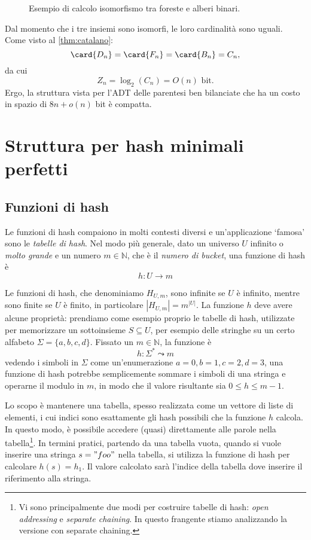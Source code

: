 \begin{figure}[ht]
	\centering
	
	\caption{Esempio di calcolo isomorfismo tra foreste e alberi binari.}
	\label{fig:iso_forest_bintree_example}
\end{figure}

Dal momento che i tre insiemi sono isomorfi, le loro cardinalità sono uguali. Come visto al \cref{thm:catalano}:
\begin{equation*}
	\card{D_n}=\card{F_n}=\card{B_n}=C_n \text,
\end{equation*}
da cui
\begin{equation*}
	Z_n=\log_2(C_n)=O(n) \text{ bit}.
\end{equation*}
Ergo, la struttura vista per l'ADT delle parentesi ben bilanciate che ha un costo in spazio di $8n+o(n)$ bit è compatta.



\section{Struttura per hash minimali perfetti}
\subsection{Funzioni di hash}
Le funzioni di hash compaiono in molti contesti diversi e un'applicazione
`famosa' sono le \textit{tabelle di hash}.
Nel modo più generale, dato un universo $U$ infinito o \textit{molto grande} e un numero $m \in \mathbb{N}$,
che è il \textit{numero di bucket}, una funzione di hash è
$$
	h: U \rightarrow m
$$

Le funzioni di hash, che denominiamo $H_{U,m}$, sono infinite se $U$ è infinito, mentre sono finite
se $U$ è finito, in particolare $|H_{U,m}| = m^{|U|}$.
La funzione $h$ deve avere alcune proprietà: prendiamo come esempio proprio le tabelle di hash,
utilizzate per memorizzare un sottoinsieme $S \subseteq U$, per esempio delle stringhe su un certo
alfabeto $\Sigma = \{a, b, c, d\}$. Fissato un $m \in \mathbb{N}$, la funzione è
$$
	h: \Sigma^* \leadsto m
$$
vedendo i simboli in $\Sigma$ come un'enumerazione $a = 0, b = 1, c =2, d = 3$,
una funzione di hash potrebbe semplicemente sommare i simboli di una stringa e
operarne il modulo in $m$, in modo che il valore risultante sia $0 \leq h \le m-1 $.

Lo scopo è mantenere una tabella, spesso realizzata come un vettore di liste di
elementi, i cui indici sono esattamente gli hash possibili che la funzione $h$
calcola. In questo modo, è possibile accedere (quasi) direttamente alle
parole nella tabella\footnote{Vi sono principalmente due modi per costruire
	tabelle di hash: \textit{open addressing} e \textit{separate chaining}.
	In questo frangente stiamo analizzando la versione con separate chaining.}.
In termini pratici, partendo da una tabella vuota, quando
si vuole inserire una stringa $s = "foo"$ nella tabella, si utilizza la funzione
di hash per calcolare $h(s) = h_1$. Il valore calcolato sarà l'indice della
tabella dove inserire il riferimento alla stringa.


